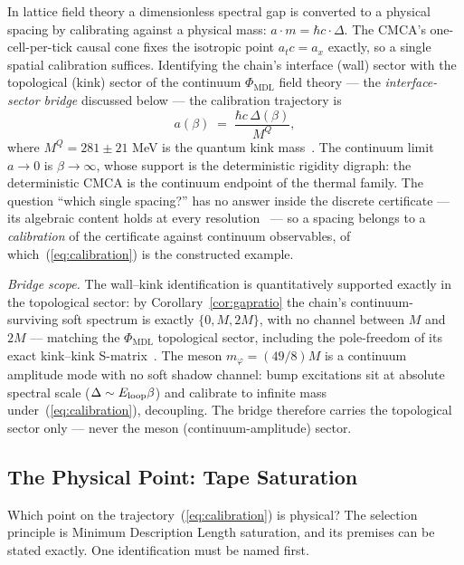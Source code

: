 \documentclass[11pt]{article}
\theoremstyle{remark}
\newcommand{\PHIMDL}{\ensuremath{\Phi_{\mathrm{MDL}}}}
\begin{document}
In lattice field theory a dimensionless spectral gap is converted to a
physical spacing by calibrating against a physical mass: $a \cdot m = \hbar c
\cdot \Delta$. The CMCA's one-cell-per-tick causal cone fixes the isotropic
point $a_t c = a_x$ exactly, so a single spatial calibration suffices.
Identifying the chain's interface (wall) sector with the topological (kink)
sector of the continuum $\PHIMDL{}$ field theory --- the
\emph{interface-sector bridge} discussed below --- the calibration trajectory
is
\begin{equation}\label{eq:calibration}
  a(\beta) \;=\; \frac{\hbar c\, \Delta(\beta)}{M^Q},
\end{equation}
where $M^Q = 281 \pm 21$ MeV is the quantum kink
mass~\cite{SpivackPhiMDLField}. The continuum limit $a \to 0$ is
$\beta \to \infty$, whose support is the deterministic rigidity digraph: the
deterministic CMCA is the continuum endpoint of the thermal family. The
question ``which single spacing?'' has no answer inside the discrete
certificate --- its algebraic content holds at every
resolution~\cite{SpivackCompleteness} --- so a spacing belongs to a
\emph{calibration} of the certificate against continuum observables, of
which~(\ref{eq:calibration}) is the constructed example.

\medskip
\noindent\emph{Bridge scope.} The wall--kink identification is quantitatively
supported exactly in the topological sector: by
Corollary~\ref{cor:gapratio} the chain's continuum-surviving soft spectrum is
exactly $\{0, M, 2M\}$, with no channel between $M$ and $2M$ --- matching the
$\PHIMDL{}$ topological sector, including the pole-freedom of its exact
kink--kink S-matrix~\cite{SpivackPhiMDLField}. The meson
$m_\varphi = (49/8)M$ is a continuum amplitude mode with no soft shadow
channel: bump excitations sit at absolute spectral scale
($\Delta \sim E_{\rm loop}\beta$) and calibrate to infinite mass
under~(\ref{eq:calibration}), decoupling. The bridge therefore carries the
topological sector only --- never the meson (continuum-amplitude) sector.

\subsection{The Physical Point: Tape Saturation}
\label{sec:physpoint}

Which point on the trajectory~(\ref{eq:calibration}) is physical? The
selection principle is Minimum Description Length saturation, and its premises
can be stated exactly. One identification must be named first.
\end{document}
